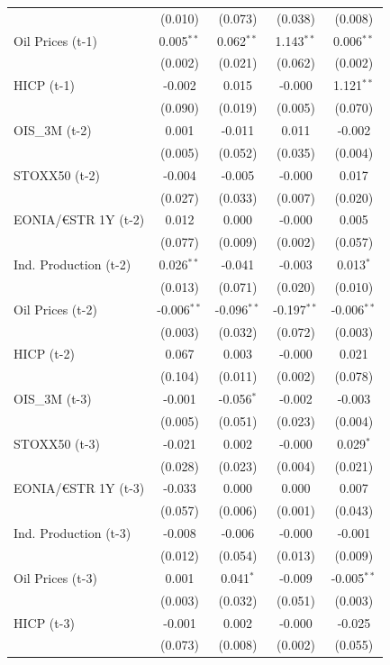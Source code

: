 \begin{longtable}[t]{lcccc}
 & (0.010) & (0.073) & (0.038) & (0.008)\\
Oil Prices (t-1) & 0.005$^{**}$ & 0.062$^{**}$ & 1.143$^{**}$ & 0.006$^{**}$\\
 & (0.002) & (0.021) & (0.062) & (0.002)\\
HICP (t-1) & -0.002 & 0.015 & -0.000 & 1.121$^{**}$\\
 & (0.090) & (0.019) & (0.005) & (0.070)\\
OIS\_3M (t-2) & 0.001 & -0.011 & 0.011 & -0.002\\
 & (0.005) & (0.052) & (0.035) & (0.004)\\
STOXX50 (t-2) & -0.004 & -0.005 & -0.000 & 0.017\\
 & (0.027) & (0.033) & (0.007) & (0.020)\\
EONIA/€STR 1Y (t-2) & 0.012 & 0.000 & -0.000 & 0.005\\
 & (0.077) & (0.009) & (0.002) & (0.057)\\
Ind. Production (t-2) & 0.026$^{**}$ & -0.041 & -0.003 & 0.013$^{*}$\\
 & (0.013) & (0.071) & (0.020) & (0.010)\\
Oil Prices (t-2) & -0.006$^{**}$ & -0.096$^{**}$ & -0.197$^{**}$ & -0.006$^{**}$\\
 & (0.003) & (0.032) & (0.072) & (0.003)\\
HICP (t-2) & 0.067 & 0.003 & -0.000 & 0.021\\
 & (0.104) & (0.011) & (0.002) & (0.078)\\
OIS\_3M (t-3) & -0.001 & -0.056$^{*}$ & -0.002 & -0.003\\
 & (0.005) & (0.051) & (0.023) & (0.004)\\
STOXX50 (t-3) & -0.021 & 0.002 & -0.000 & 0.029$^{*}$\\
 & (0.028) & (0.023) & (0.004) & (0.021)\\
EONIA/€STR 1Y (t-3) & -0.033 & 0.000 & 0.000 & 0.007\\
 & (0.057) & (0.006) & (0.001) & (0.043)\\
Ind. Production (t-3) & -0.008 & -0.006 & -0.000 & -0.001\\
 & (0.012) & (0.054) & (0.013) & (0.009)\\
Oil Prices (t-3) & 0.001 & 0.041$^{*}$ & -0.009 & -0.005$^{**}$\\
 & (0.003) & (0.032) & (0.051) & (0.003)\\
HICP (t-3) & -0.001 & 0.002 & -0.000 & -0.025\\
 & (0.073) & (0.008) & (0.002) & (0.055)\\

\end{longtable}
